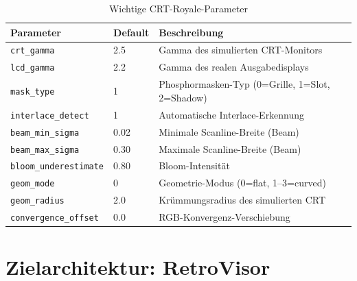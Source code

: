 \documentclass[11pt, a4paper]{article}
\newcommand{\tableheadercolor}{\rowcolor{hkared}}
\newcommand{\thw}[1]{\color{white}\textbf{#1}}  %
\begin{document}
\begin{table}[H]
\centering
\small
{}
\begin{tabularx}{\textwidth}{llX}
    \toprule
    \tableheadercolor \thw{Parameter} & \thw{Default} & \thw{Beschreibung} \\
    \midrule
    \texttt{crt\_gamma} & 2.5 & Gamma des simulierten CRT-Monitors \\
    \texttt{lcd\_gamma} & 2.2 & Gamma des realen Ausgabedisplays \\
    \texttt{mask\_type} & 1 & Phosphormasken-Typ (0=Grille, 1=Slot, 2=Shadow) \\
    \texttt{interlace\_detect} & 1 & Automatische Interlace-Erkennung \\
    \texttt{beam\_min\_sigma} & 0.02 & Minimale Scanline-Breite (Beam) \\
    \texttt{beam\_max\_sigma} & 0.30 & Maximale Scanline-Breite (Beam) \\
    \texttt{bloom\_underestimate} & 0.80 & Bloom-Intensit\"at \\
    \texttt{geom\_mode} & 0 & Geometrie-Modus (0=flat, 1--3=curved) \\
    \texttt{geom\_radius} & 2.0 & Kr\"ummungsradius des simulierten CRT \\
    \texttt{convergence\_offset} & 0.0 & RGB-Konvergenz-Verschiebung \\
    \bottomrule
\end{tabularx}
 \vspace{.25cm}
\caption{Wichtige CRT-Royale-Parameter}
\end{table} \vspace{1cm}
\section{Zielarchitektur: RetroVisor}
\vspace{.75cm}
\end{document}
